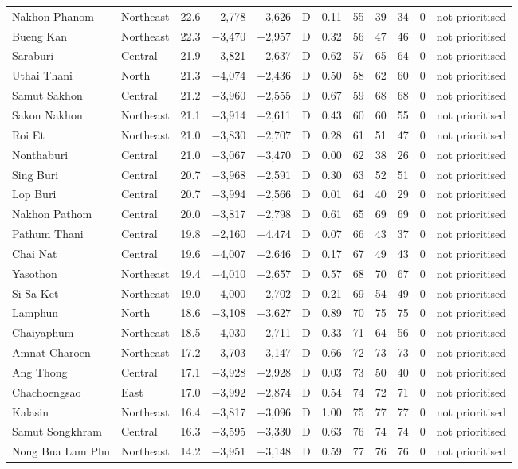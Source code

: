 \begin{longtable}{llrrrcrrrrrl}
Nakhon Phanom & Northeast & 22.6 & $-$2,778 & $-$3,626 & D & 0.11 & 55 & 39 & 34 & 0 & not prioritised \\
Bueng Kan & Northeast & 22.3 & $-$3,470 & $-$2,957 & D & 0.32 & 56 & 47 & 46 & 0 & not prioritised \\
Saraburi & Central & 21.9 & $-$3,821 & $-$2,637 & D & 0.62 & 57 & 65 & 64 & 0 & not prioritised \\
Uthai Thani & North & 21.3 & $-$4,074 & $-$2,436 & D & 0.50 & 58 & 62 & 60 & 0 & not prioritised \\
Samut Sakhon & Central & 21.2 & $-$3,960 & $-$2,555 & D & 0.67 & 59 & 68 & 68 & 0 & not prioritised \\
Sakon Nakhon & Northeast & 21.1 & $-$3,914 & $-$2,611 & D & 0.43 & 60 & 60 & 55 & 0 & not prioritised \\
Roi Et & Northeast & 21.0 & $-$3,830 & $-$2,707 & D & 0.28 & 61 & 51 & 47 & 0 & not prioritised \\
Nonthaburi & Central & 21.0 & $-$3,067 & $-$3,470 & D & 0.00 & 62 & 38 & 26 & 0 & not prioritised \\
Sing Buri & Central & 20.7 & $-$3,968 & $-$2,591 & D & 0.30 & 63 & 52 & 51 & 0 & not prioritised \\
Lop Buri & Central & 20.7 & $-$3,994 & $-$2,566 & D & 0.01 & 64 & 40 & 29 & 0 & not prioritised \\
Nakhon Pathom & Central & 20.0 & $-$3,817 & $-$2,798 & D & 0.61 & 65 & 69 & 69 & 0 & not prioritised \\
Pathum Thani & Central & 19.8 & $-$2,160 & $-$4,474 & D & 0.07 & 66 & 43 & 37 & 0 & not prioritised \\
Chai Nat & Central & 19.6 & $-$4,007 & $-$2,646 & D & 0.17 & 67 & 49 & 43 & 0 & not prioritised \\
Yasothon & Northeast & 19.4 & $-$4,010 & $-$2,657 & D & 0.57 & 68 & 70 & 67 & 0 & not prioritised \\
Si Sa Ket & Northeast & 19.0 & $-$4,000 & $-$2,702 & D & 0.21 & 69 & 54 & 49 & 0 & not prioritised \\
Lamphun & North & 18.6 & $-$3,108 & $-$3,627 & D & 0.89 & 70 & 75 & 75 & 0 & not prioritised \\
Chaiyaphum & Northeast & 18.5 & $-$4,030 & $-$2,711 & D & 0.33 & 71 & 64 & 56 & 0 & not prioritised \\
Amnat Charoen & Northeast & 17.2 & $-$3,703 & $-$3,147 & D & 0.66 & 72 & 73 & 73 & 0 & not prioritised \\
Ang Thong & Central & 17.1 & $-$3,928 & $-$2,928 & D & 0.03 & 73 & 50 & 40 & 0 & not prioritised \\
Chachoengsao & East & 17.0 & $-$3,992 & $-$2,874 & D & 0.54 & 74 & 72 & 71 & 0 & not prioritised \\
Kalasin & Northeast & 16.4 & $-$3,817 & $-$3,096 & D & 1.00 & 75 & 77 & 77 & 0 & not prioritised \\
Samut Songkhram & Central & 16.3 & $-$3,595 & $-$3,330 & D & 0.63 & 76 & 74 & 74 & 0 & not prioritised \\
Nong Bua Lam Phu & Northeast & 14.2 & $-$3,951 & $-$3,148 & D & 0.59 & 77 & 76 & 76 & 0 & not prioritised \\
\end{longtable}
